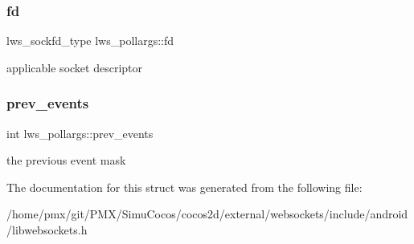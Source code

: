 \subsubsection{\texorpdfstring{fd}{fd}}
{\footnotesize\ttfamily lws\+\_\+sockfd\+\_\+type lws\+\_\+pollargs\+::fd}

applicable socket descriptor \mbox{\label{structlws__pollargs_a437fec0de5cf264371e1ab5a401e86d8}} 
\subsubsection{\texorpdfstring{prev\+\_\+events}{prev\_events}}
{\footnotesize\ttfamily int lws\+\_\+pollargs\+::prev\+\_\+events}

the previous event mask 

The documentation for this struct was generated from the following file\+:\begin{DoxyCompactItemize}
\item 
/home/pmx/git/\+P\+M\+X/\+Simu\+Cocos/cocos2d/external/websockets/include/android/libwebsockets.\+h\end{DoxyCompactItemize}
